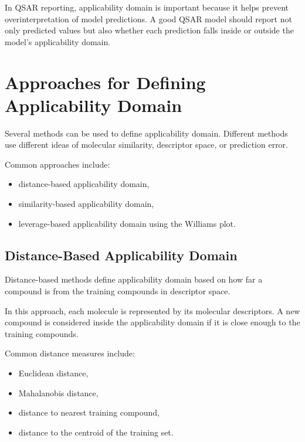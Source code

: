 \documentclass[11pt]{report}
\newenvironment{Important note}{\begin{quote}\color{red}\textbf{Important note:} }{\end{quote}}
\begin{document}
In QSAR reporting, applicability domain is important because it helps prevent overinterpretation of model predictions. A good QSAR model should report not only predicted values but also whether each prediction falls inside or outside the model's applicability domain.

\section{Approaches for Defining Applicability Domain}

Several methods can be used to define applicability domain. Different methods use different ideas of molecular similarity, descriptor space, or prediction error.

Common approaches include:

\begin{itemize}[leftmargin=*]
    \item distance-based applicability domain,
    \item similarity-based applicability domain,
    \item leverage-based applicability domain using the Williams plot.
\end{itemize}

\subsection{Distance-Based Applicability Domain}

Distance-based methods define applicability domain based on how far a compound is from the training compounds in descriptor space.

In this approach, each molecule is represented by its molecular descriptors. A new compound is considered inside the applicability domain if it is close enough to the training compounds.

Common distance measures include:

\begin{itemize}[leftmargin=*]
    \item Euclidean distance,
    \item Mahalanobis distance,
    \item distance to nearest training compound,
    \item distance to the centroid of the training set.
\end{itemize}
\end{document}
